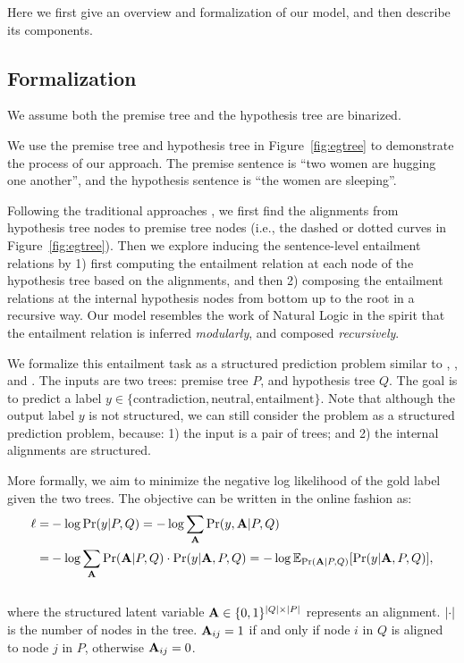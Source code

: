 
Here we first give an overview and formalization of our model, 
and then describe its components.

\subsection{Formalization}

We assume both the premise tree and the hypothesis tree are 
binarized.

We use the premise tree and hypothesis tree 
in Figure~\ref{fig:egtree} to demonstrate the process 
of our approach.
The premise sentence is ``two women are hugging one another'',
and the hypothesis sentence is ``the women are sleeping''.

Following the traditional approaches \cite{maccartney2009extended,watanabe2012latent}, 
we first find the alignments from hypothesis
tree nodes to premise tree nodes
(i.e., the dashed or dotted curves in Figure~\ref{fig:egtree}).
Then we explore inducing the sentence-level 
entailment relations by 
1) first computing the entailment relation
at each node of the hypothesis tree based on the alignments, 
and then 2) composing the entailment relations
at the internal hypothesis nodes from bottom up
to the root in a recursive way.
Our model resembles the work of Natural Logic
\cite{maccartney2009extended} in the spirit 
that the entailment relation is inferred {\it modularly},
and composed {\it recursively}.

We formalize this entailment task as a structured prediction problem
similar to , , and .
The inputs are two trees: premise tree $P$,
and hypothesis tree $Q$. The goal is to predict a label
$y \in \{\text{contradiction}, \text{neutral}, \text{entailment}\}$.
Note that although the output label $y$ is not structured,
we can still consider the problem as a structured prediction problem,
because: 1) the input is a pair of trees; and 2)
the internal alignments are structured.

More formally, we aim to minimize the negative 
log likelihood of the 
gold label given the two trees. The objective
can be written in the online fashion as:
\vspace{-0.2cm}
\begin{align*}
\ell = & -\log\mathrm{Pr}(y|P, Q) = -\log \sum_{\mathbf{A}} \mathrm{Pr}(y, \mathbf{A}|P, Q)\\
= & -\log \sum_{\mathbf{A}} \mathrm{Pr}(\mathbf{A}|P, Q)\cdot \mathrm{Pr}(y|\mathbf{A}, P, Q)
=  -\log \mathbb{E}_{\mathrm{Pr}(\mathbf{A}|P, Q)} [\mathrm{Pr}(y|\mathbf{A}, P, Q)],
\end{align*}\\[-0.5cm]
where the structured latent variable
$\mathbf{A}\in \{0, 1\}^{|Q|\times |P|}$ represents an alignment.
$\lvert\cdot\rvert$ is the number of nodes in the tree.
$\mathbf{A}_{ij}=1$ if and only if node $i$ in $Q$ is aligned to node $j$
in $P$, otherwise $\mathbf{A}_{ij}=0$.

